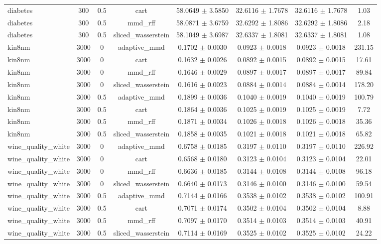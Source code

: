 \begin{table}[h]
\begin{adjustbox}{max width=\textwidth}
\begin{tabular}{lccccccc}
    diabetes & 300 & 0.5 & cart & 58.0649 $\pm$ 3.5850 & 32.6116 $\pm$ 1.7678 & 32.6116 $\pm$ 1.7678 & 1.03 \\
    diabetes & 300 & 0.5 & mmd\_rff & 58.0871 $\pm$ 3.6759 & 32.6292 $\pm$ 1.8086 & 32.6292 $\pm$ 1.8086 & 2.18 \\
    diabetes & 300 & 0.5 & sliced\_wasserstein & 58.1049 $\pm$ 3.6987 & 32.6337 $\pm$ 1.8081 & 32.6337 $\pm$ 1.8081 & 1.08 \\
    kin8nm & 3000 & 0 & adaptive\_mmd & 0.1702 $\pm$ 0.0030 & 0.0923 $\pm$ 0.0018 & 0.0923 $\pm$ 0.0018 & 231.15 \\
    kin8nm & 3000 & 0 & cart & 0.1632 $\pm$ 0.0026 & 0.0892 $\pm$ 0.0015 & 0.0892 $\pm$ 0.0015 & 17.61 \\
    kin8nm & 3000 & 0 & mmd\_rff & 0.1646 $\pm$ 0.0029 & 0.0897 $\pm$ 0.0017 & 0.0897 $\pm$ 0.0017 & 89.84 \\
    kin8nm & 3000 & 0 & sliced\_wasserstein & 0.1616 $\pm$ 0.0023 & 0.0884 $\pm$ 0.0014 & 0.0884 $\pm$ 0.0014 & 178.20 \\
    kin8nm & 3000 & 0.5 & adaptive\_mmd & 0.1899 $\pm$ 0.0036 & 0.1040 $\pm$ 0.0019 & 0.1040 $\pm$ 0.0019 & 100.79 \\
    kin8nm & 3000 & 0.5 & cart & 0.1864 $\pm$ 0.0036 & 0.1025 $\pm$ 0.0019 & 0.1025 $\pm$ 0.0019 & 7.72 \\
    kin8nm & 3000 & 0.5 & mmd\_rff & 0.1871 $\pm$ 0.0034 & 0.1026 $\pm$ 0.0018 & 0.1026 $\pm$ 0.0018 & 35.36 \\
    kin8nm & 3000 & 0.5 & sliced\_wasserstein & 0.1858 $\pm$ 0.0035 & 0.1021 $\pm$ 0.0018 & 0.1021 $\pm$ 0.0018 & 65.82 \\
    wine\_quality\_white & 3000 & 0 & adaptive\_mmd & 0.6758 $\pm$ 0.0185 & 0.3197 $\pm$ 0.0110 & 0.3197 $\pm$ 0.0110 & 226.92 \\
    wine\_quality\_white & 3000 & 0 & cart & 0.6568 $\pm$ 0.0180 & 0.3123 $\pm$ 0.0104 & 0.3123 $\pm$ 0.0104 & 22.01 \\
    wine\_quality\_white & 3000 & 0 & mmd\_rff & 0.6636 $\pm$ 0.0185 & 0.3144 $\pm$ 0.0108 & 0.3144 $\pm$ 0.0108 & 96.18 \\
    wine\_quality\_white & 3000 & 0 & sliced\_wasserstein & 0.6640 $\pm$ 0.0173 & 0.3146 $\pm$ 0.0100 & 0.3146 $\pm$ 0.0100 & 59.54 \\
    wine\_quality\_white & 3000 & 0.5 & adaptive\_mmd & 0.7144 $\pm$ 0.0166 & 0.3538 $\pm$ 0.0102 & 0.3538 $\pm$ 0.0102 & 100.91 \\
    wine\_quality\_white & 3000 & 0.5 & cart & 0.7071 $\pm$ 0.0174 & 0.3502 $\pm$ 0.0104 & 0.3502 $\pm$ 0.0104 & 8.88 \\
    wine\_quality\_white & 3000 & 0.5 & mmd\_rff & 0.7097 $\pm$ 0.0170 & 0.3514 $\pm$ 0.0103 & 0.3514 $\pm$ 0.0103 & 40.91 \\
    wine\_quality\_white & 3000 & 0.5 & sliced\_wasserstein & 0.7114 $\pm$ 0.0169 & 0.3525 $\pm$ 0.0102 & 0.3525 $\pm$ 0.0102 & 24.22 \\
    \bottomrule
  \end{tabular}
  \end{adjustbox}
\end{table}
